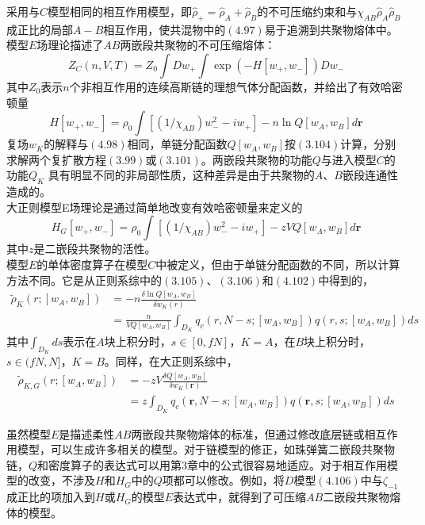 采用与$C$模型相同的相互作用模型，即$\hat{\rho}_{+}=\hat{\rho}_{A}+\hat{\rho}_{B}$的不可压缩约束和与$\chi_{AB} \hat{\rho}_{A} \hat{\rho}_{B}$成正比的局部$A-B$相互作用，使共混物中的$(4.97)$易于追溯到共聚物熔体中。模型$E$场理论描述了$AB$两嵌段共聚物的不可压缩熔体：\\
\begin{equation}
Z_{C}(n,V,T)=Z_{0} \int D w_{+} \int  \exp (-H[w_{+},w_{-}])D w_{-}
\end{equation}
其中$Z_0$表示$n$个非相互作用的连续高斯链的理想气体分配函数，并给出了有效哈密顿量\\
\begin{equation}
H[ w_{+}, w_{-}]= \rho_{0} \int  [(1/\chi_{AB})w_{-}^{2}-i w_{+}]-n \ln Q[w_{A},w_{B}]d \mathbf{r}
\end{equation}
复场$w_{K}$的解释与$(4.98)$相同，单链分配函数$Q[w_{A},w_{B}]$按$(3.104)$计算，分别求解两个复扩散方程$(3.99)$或$(3.101)$。两嵌段共聚物的功能$Q$与进入模型$C$的功能$Q_{K}$ 具有明显不同的非局部性质，这种差异是由于共聚物的$A$、$B$嵌段连通性造成的。\\

大正则模型E场理论是通过简单地改变有效哈密顿量来定义的\\
\begin{equation}
H_{G}[ w_{+}, w_{-}]= \rho_{0} \int  [(1/\chi_{AB}) w_{-}^{2}-i w_{+}]- z  V Q[w_{A},w_{B}]d\mathbf{r}
\end{equation}
其中$z$是二嵌段共聚物的活性。\\

模型$E$的单体密度算子在模型$C$中被定义，但由于单链分配函数的不同，所以计算方法不同。它是从正则系综中的$(3.105)$、$(3.106)$和$(4.102)$中得到的，\\
\begin{equation}
\begin{aligned}
\tilde{\rho}_{K}(r;[w_{A},w_{B}]) &=-n \frac{\delta \ln Q[w_{A},w_{B}]}{\delta w_{K}(r)} \\&= \frac{n}{V Q[w_{A},w_{B}]} \int_{D_{K}} q_{c}(r,N-s;[w_{A},w_{B}])q(r,s;[w_{A},w_{B}])ds
\end{aligned}
\end{equation}
其中$\int_{D_{K}} ds$表示在$A$块上积分时，$s\in[0,fN]$，$K=A$，在$B$块上积分时，$s\in(fN,N]$，$K=B$。同样，在大正则系综中，\\
\begin{equation}
\begin{aligned}
\tilde{\rho}_{K,G}(r;[w_{A},w_{B}])&=-z V \frac{\delta Q[w_{A},w_{B}]}{\delta w_{K}(\mathbf{r})} \\&= z \int_{D_{K}}  q_{c}(\mathbf{r},N-s;[w_{A},w_{B}])q(\mathbf{r},s;[w_{A},w_{B}])d s
\end{aligned}
\end{equation}

虽然模型$E$是描述柔性$AB$两嵌段共聚物熔体的标准，但通过修改底层链或相互作用模型，可以生成许多相关的模型。对于链模型的修正，如珠弹簧二嵌段共聚物链，$Q$和密度算子的表达式可以用第3章中的公式很容易地适应。对于相互作用模型的改变，不涉及$H$和$H_{G}$中的$Q$项都可以修改。例如，将$D$模型$(4.106)$中与$\zeta_{-1}$成正比的项加入到$H$或$H_{G}$的模型$E$表达式中，就得到了可压缩$AB$二嵌段共聚物熔体的模型。

